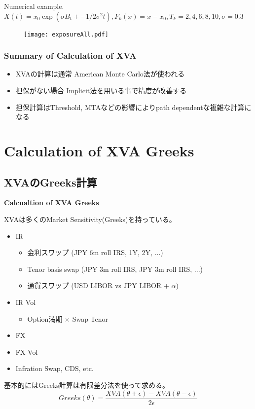 \documentclass[driverfallback=dvipdfmx,cjk]{beamer}
\begin{document}
\begin{frame}
    Numerical example.
$X(t) = x_0 \exp(\sigma B_t + - 1/2 \sigma^2 t), F_k(x) = x - x_0, T_k = 2, 4, 6, 8, 10, \sigma = 0.3$
    \begin{figure}
        \texttt{[image: exposureAll.pdf]}
    \end{figure}
\end{frame}

\begin{frame}\frametitle{Summary of Calculation of XVA}
\begin{itemize}
    \item XVAの計算は通常 American Monte Carlo法が使われる
    \item 担保がない場合 Implicit法を用いる事で精度が改善する
    \item 担保計算はThreshold, MTAなどの影響によりpath dependentな複雑な計算になる
\end{itemize}    
\end{frame}

\section{Calculation of XVA Greeks}
\subsection{XVAのGreeks計算}
\begin{frame}
    \textbf{Calcualtion of XVA Greeks}
\end{frame}

\begin{frame}
    XVAは多くのMarket Sensitivity(Greeks)を持っている。
    \begin{itemize}
        \item IR
            \begin{itemize}
                \item 金利スワップ (JPY 6m roll IRS, 1Y, 2Y, ...)
                \item Tenor basis swap (JPY 3m roll IRS, JPY 3m roll IRS, ...)
                \item 通貨スワップ (USD LIBOR vs JPY LIBOR + $\alpha$)
            \end{itemize}
        \item IR Vol
            \begin{itemize}
                \item Option満期 $\times$ Swap Tenor
            \end{itemize}
        \item FX 
        \item FX Vol
        \item Infration Swap, CDS, etc.
    \end{itemize}
    基本的にはGreeks計算は有限差分法を使って求める。
    $$Greeks(\theta) = \frac{XVA(\theta+ \epsilon) - XVA(\theta - \epsilon)}{2 \epsilon} $$
\end{frame}
\end{document}
